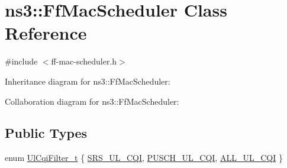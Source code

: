\hypertarget{classns3_1_1FfMacScheduler}{}\section{ns3\+:\+:Ff\+Mac\+Scheduler Class Reference}
\label{classns3_1_1FfMacScheduler}


{\ttfamily \#include $<$ff-\/mac-\/scheduler.\+h$>$}



Inheritance diagram for ns3\+:\+:Ff\+Mac\+Scheduler\+:


Collaboration diagram for ns3\+:\+:Ff\+Mac\+Scheduler\+:
\subsection*{Public Types}
\begin{DoxyCompactItemize}
\item 
enum \hyperlink{classns3_1_1FfMacScheduler_aa47a9eb25f2c558c825b0be645304a52}{Ul\+Cqi\+Filter\+\_\+t} \{ \hyperlink{classns3_1_1FfMacScheduler_aa47a9eb25f2c558c825b0be645304a52af2e0df473ba2c8f9cb131cb760591aed}{S\+R\+S\+\_\+\+U\+L\+\_\+\+C\+QI}, 
\hyperlink{classns3_1_1FfMacScheduler_aa47a9eb25f2c558c825b0be645304a52a4a833bc779439b15bd904e1dd8eaa563}{P\+U\+S\+C\+H\+\_\+\+U\+L\+\_\+\+C\+QI}, 
\hyperlink{classns3_1_1FfMacScheduler_aa47a9eb25f2c558c825b0be645304a52a84059a597c72335f0a5963c3efcbda71}{A\+L\+L\+\_\+\+U\+L\+\_\+\+C\+QI}
 \}
\end{DoxyCompactItemize}
